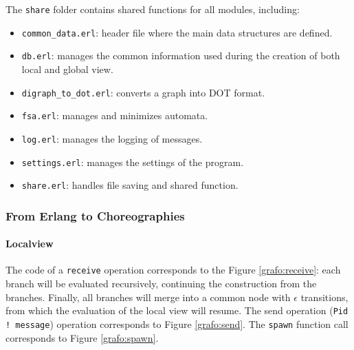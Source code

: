 \noindent The \texttt{share} folder contains shared functions for all modules, including:  
\begin{itemize}  
  \item \texttt{common\_data.erl}: header file where the main data structures are defined.  
  \item \texttt{db.erl}: manages the common information used during the creation
  of both local and global view.  
  \item \texttt{digraph\_to\_dot.erl}: converts a graph into DOT format.  
  \item \texttt{fsa.erl}: manages and minimizes automata.  
  \item \texttt{log.erl}: manages the logging of messages.  
  \item \texttt{settings.erl}: manages the settings of the program.  
  \item \texttt{share.erl}: handles file saving and shared function.  
\end{itemize}  

\subsubsection{From Erlang to Choreographies}
\label{sec:corrisp}

\paragraph{Localview}

The code of a \texttt{receive} operation corresponds to the Figure \ref{grafo:receive}:
each branch will be evaluated recursively, continuing the construction from the 
branches. Finally, all branches will merge into a common node with $\epsilon$ 
transitions, from which the evaluation of the local view will resume.  
The send operation (\texttt{Pid ! message}) operation corresponds to Figure \ref{grafo:send}.  
The \texttt{spawn} function call corresponds to Figure \ref{grafo:spawn}.  

